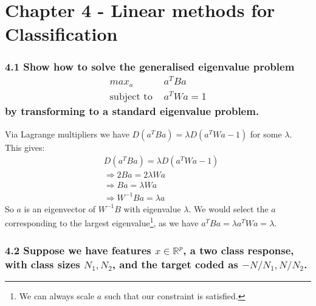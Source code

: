 
\chapter{Chapter 4 - Linear methods for Classification}

\subsection*{4.1 Show how to solve the generalised eigenvalue problem
\begin{align*}
    max_a & a^T Ba\\
    \text{subject to }& a^T W a =1
\end{align*}
by transforming to a standard eigenvalue problem.}

Via Lagrange multipliers we have $D (a^T B a) = \lambda D (a^T W a -1)$ for some $\lambda$.
This gives:
\begin{align*}
& D (a^T B a) = \lambda D (a^T W a -1)\\
    &\Rightarrow 2 B a = 2\lambda W a \\ 
   &\Rightarrow B a = \lambda W a \\ 
   &\Rightarrow W^{-1}B a = \lambda a 
\end{align*}
So $a$ is an eigenvector of $W^{-1}B$ with eigenvalue $\lambda$. We would select the $a$ corresponding to the largest eigenvalue\footnote{We can always scale $a$ such that our constraint is satisfied.}, as we have
$a^T B a = \lambda a^T W a = \lambda$.

\subsection*{4.2 Suppose we have features $x \in \mathbb{R}^p$, a two class response, with class sizes $N_1, N_2$, and the target coded as $-N/N_1, N/N_2$.}
